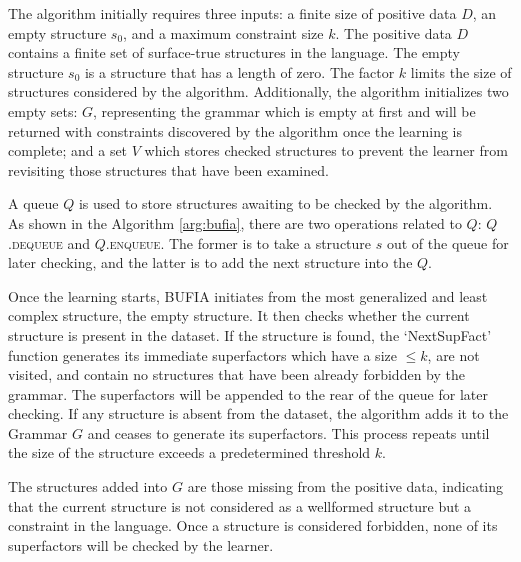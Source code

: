 \documentclass[11pt,letterpaper]{article}
\begin{document}
The algorithm initially requires three inputs: a finite size of positive data \( D \), an empty structure \( s_0 \), and a maximum constraint size \( k \). The positive data \( D \) contains a finite set of surface-true structures in the language. The empty structure \( s_0 \) is a structure that has a length of zero. The factor \( k \) limits the size of structures considered by the algorithm. Additionally, the algorithm initializes two empty sets: \( G \), representing the grammar which is empty at first and will be returned with constraints discovered by the algorithm once the learning is complete; and a set \( V \) which stores checked structures to prevent the learner from revisiting those structures that have been examined.


A queue \(Q\) is used to store structures awaiting to be checked by the algorithm. As shown in the Algorithm \ref{arg:bufia}, there are two operations related to \(Q\): \(Q\).\textsc{dequeue} and  \(Q.\)\textsc{enqueue}. The former is to take a structure \(s\) out of the queue for later checking, and the latter is to add the next structure into the \(Q\). 


Once the learning starts, BUFIA initiates from the most generalized and least complex structure, the empty structure. It then checks whether the current structure is present in the dataset. If the structure is found, the `NextSupFact' function generates its immediate superfactors which have a size $\leq k$, are not visited, and contain no structures that have been already forbidden by the grammar. The superfactors will be appended to the rear of the queue for later checking. If any structure is absent from the dataset, the algorithm adds it to the Grammar $G$ and ceases to generate its superfactors. This process repeats until the size of the structure exceeds a predetermined threshold \(k\). 

The structures added into $G$ are those missing from the positive data, indicating that the current structure is not considered as a wellformed structure but a constraint in the language. Once a structure is considered forbidden, none of its superfactors will be checked by the learner.
\end{document}
